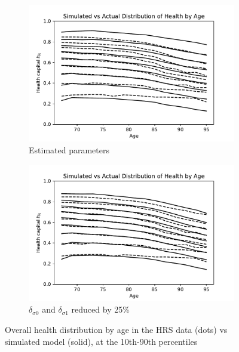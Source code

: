 \documentclass[12pt,pdftex,letterpaper]{article}
\newcommand{\HealthParam}{\delta}
\begin{document}
\begin{figure}[ht!]
    \centering
    \begin{subfigure}[b]{0.49\textwidth}
        \centering
        \includegraphics[width=\textwidth]{../Figures/HealthDistribution.pdf}
        \caption{Estimated parameters}
    \end{subfigure}
    \begin{subfigure}[b]{0.49\textwidth}
        \centering
        \includegraphics[width=\textwidth]{../Figures/HealthDistributionAlt.pdf}
        \caption{$\HealthParam_{\sigma 0}$ and $\HealthParam_{\sigma 1}$ reduced by 25\%}
    \end{subfigure}
    \caption{Overall health distribution by age in the HRS data (dots) vs simulated model (solid), at the 10th-90th percentiles}
    \label{fig:HealthDistribution}
\end{figure}
\end{document}

